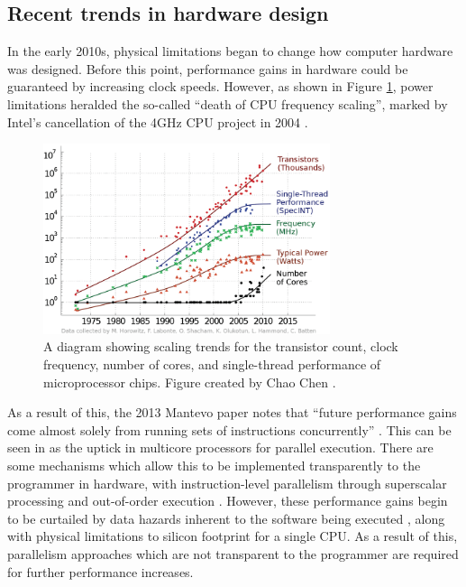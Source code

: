 \subsection{Recent trends in hardware design}
\label{ssec:hardware-design-trends} %

In the early 2010s, physical limitations began to change how computer hardware was designed. Before this point, performance gains in hardware could be guaranteed by increasing clock speeds. However, as shown in Figure \ref{fig:scaling-trends-transistor-clock}, power limitations heralded the so-called ``death of CPU frequency scaling'', marked by Intel's cancellation of the 4GHz CPU project in 2004 \cite{markovLimitsFundamentalLimits2014}.

\begin{figure}[H]
    \centering
    \includegraphics[width=0.75\textwidth]{images/2_background/1-Trends-in-transistor-count-performance-core-count-and-power-over-the-past-decades.png}
    \caption{A diagram showing scaling trends for the transistor count, clock frequency, number of cores, and single-thread performance of microprocessor chips. Figure created by Chao Chen \cite{chen_energy-efficient_2014}.}
    \label{fig:scaling-trends-transistor-clock}
\end{figure}

As a result of this, the 2013 Mantevo paper notes that ``future performance gains come almost solely from running sets of instructions concurrently'' \cite{heroux2013mantevo}. This can be seen in \label{fig:scaling-trends-transistor-clock} as the uptick in multicore processors for parallel execution. There are some mechanisms which allow this to be implemented transparently to the programmer in hardware, with instruction-level parallelism through superscalar processing and out-of-order execution \cite{pattersonHennessyComputerOrganisationArchitecture}. However, these performance gains begin to be curtailed by data hazards inherent to the software being executed \cite{shahhoseini1999achieving}, along with physical limitations to silicon footprint for a single CPU. As a result of this, parallelism approaches which are not transparent to the programmer are required for further performance increases.

